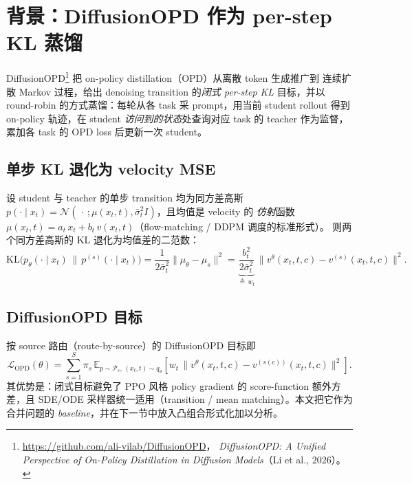\documentclass[11pt,a4paper]{article}
\newcommand{\loss}{\mathcal{L}}
\newcommand{\E}{\mathbb{E}}
\newcommand{\KL}{\mathrm{KL}}
\newcommand{\N}{\mathcal{N}}
\newcommand{\OPD}{\mathrm{OPD}}
\newcommand{\stu}{\theta}
\theoremstyle{definition}
\begin{document}
\section{背景：DiffusionOPD 作为 per-step KL 蒸馏}
\label{sec:opd}

DiffusionOPD\footnote{\url{https://github.com/ali-vilab/DiffusionOPD}，
\emph{DiffusionOPD: A Unified Perspective of On-Policy Distillation in Diffusion
Models}（Li et al., 2026）。} 把 on-policy distillation（OPD）从离散 token 生成推广到
连续扩散 Markov 过程，给出 denoising transition 的\emph{闭式 per-step KL} 目标，并以
round-robin 的方式蒸馏：每轮从各 task 采 prompt，用当前 student rollout 得到 on-policy
轨迹，在 student \emph{访问到的状态}处查询对应 task 的 teacher 作为监督，累加各 task 的
OPD loss 后更新一次 student。

\subsection{单步 KL 退化为 velocity MSE}
\label{ssec:perstep}

设 student 与 teacher 的单步 transition 均为同方差高斯
$p(\cdot\mid x_t)=\N(\,\cdot\,;\mu(x_t,t),\bar\sigma_t^2 I)$，且均值是 velocity 的
\emph{仿射}函数 $\mu(x_t,t)=a_t\,x_t+b_t\,v(x_t,t)$（flow-matching / DDPM 调度的标准形式）。
则两个同方差高斯的 KL 退化为均值差的二范数：
\begin{equation}
\KL\!\big(p_\theta(\cdot\mid x_t)\,\big\|\,p^{(s)}(\cdot\mid x_t)\big)
=\frac{1}{2\bar\sigma_t^2}\big\|\mu_\theta-\mu_s\big\|^2
=\underbrace{\frac{b_t^2}{2\bar\sigma_t^2}}_{\triangleq\,w_t}\,
\big\|v^\stu(x_t,t,c)-v^{(s)}(x_t,t,c)\big\|^2 .
\label{eq:perstep_kl}
\end{equation}

\subsection{DiffusionOPD 目标}
\label{ssec:opd_obj}

按 source 路由（route-by-source）的 DiffusionOPD 目标即
\begin{equation}
\loss_{\OPD}(\theta)=\sum_{s=1}^S \pi_s\,
\E_{p\sim\mathcal{P}_s,\,(x_t,t)\sim q_\theta}\!\left[
w_t\,\big\|v^\stu(x_t,t,c)-v^{(s(c))}(x_t,t,c)\big\|^2\right].
\label{eq:opd_obj}
\end{equation}
其优势是：闭式目标避免了 PPO 风格 policy gradient 的 score-function 额外方差，且
SDE/ODE 采样器统一适用（transition / mean matching）。本文把它作为合并问题的
\emph{baseline}，并在下一节中放入凸组合形式化加以分析。
\end{document}
